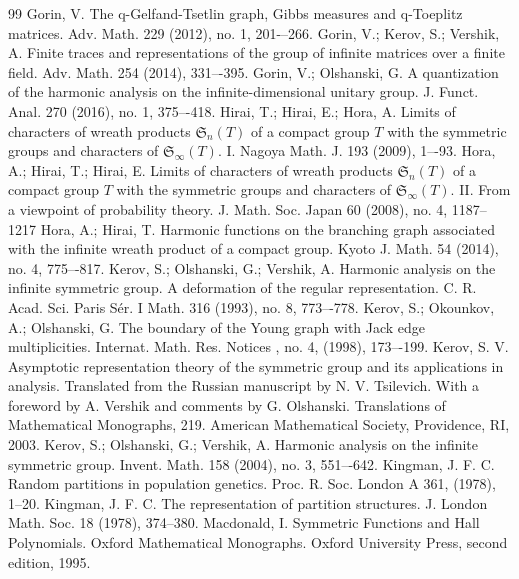 \documentclass[12pt]{amsart}
\theoremstyle{definition}
\numberwithin{equation}{section}
\begin{document}
\begin{thebibliography}{99}
  Gorin, V. The q-Gelfand-Tsetlin graph, Gibbs measures and q-Toeplitz matrices. Adv. Math. 229 (2012), no. 1, 201-–266.
 Gorin, V.; Kerov, S.; Vershik, A. Finite traces and representations of the group of infinite matrices over a finite field. Adv. Math. 254 (2014), 331–-395.
 Gorin, V.; Olshanski, G. A quantization of the harmonic analysis on the infinite-dimensional unitary group. J. Funct. Anal. 270 (2016), no. 1, 375–-418.
 Hirai, T.; Hirai, E.; Hora, A. Limits of characters of wreath products $\mathfrak{S}_n(T)$ of a compact group $T$ with the symmetric groups and characters of $\mathfrak{S}_{\infty}(T)$. I. Nagoya Math. J. 193 (2009), 1–-93.
 Hora, A.; Hirai, T.; Hirai, E. Limits of characters of wreath products $\mathfrak{S}_n(T)$ of a compact group $T$ with the symmetric groups and characters of
$\mathfrak{S}_{\infty}(T)$. II. From a viewpoint of probability theory. J. Math. Soc. Japan 60 (2008), no. 4, 1187–1217
 Hora, A.; Hirai, T. Harmonic functions on the branching graph associated with the infinite wreath product of a compact group. Kyoto J. Math. 54 (2014), no. 4, 775–-817.
Kerov, S.; Olshanski, G.; Vershik, A. Harmonic analysis on the infinite symmetric group. A deformation of the regular representation. C. R. Acad. Sci. Paris Sér. I Math. 316 (1993), no. 8, 773–-778.
 Kerov, S.; Okounkov, A.; Olshanski, G.
The boundary of the Young graph with Jack edge multiplicities.
Internat. Math. Res. Notices , no. 4, (1998), 173–-199.
  Kerov, S. V. Asymptotic representation theory of the symmetric group and its applications in analysis. Translated from the Russian manuscript by N. V. Tsilevich. With a foreword by A. Vershik and comments by G. Olshanski. Translations of Mathematical Monographs, 219. American Mathematical Society, Providence, RI, 2003.
Kerov, S.; Olshanski, G.; Vershik, A. Harmonic analysis on the infinite symmetric group. Invent. Math. 158 (2004), no. 3, 551–-642.
 Kingman, J. F. C. Random partitions in population genetics. Proc. R. Soc. London A 361, (1978), 1--20.
Kingman, J. F. C. The representation of partition structures. J. London Math. Soc. 18 (1978), 374--380.
 Macdonald, I. Symmetric Functions and Hall Polynomials. Oxford Mathematical Monographs. Oxford University Press, second edition, 1995.

\end{thebibliography}
\end{document}
